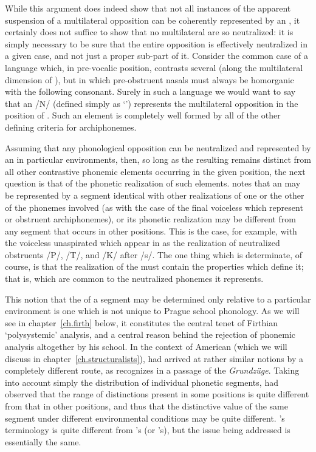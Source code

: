 While this argument does indeed show that not all instances of the
apparent suspension of a multilateral opposition can be coherently
represented by an , it certainly does not suffice to show
that no multilateral  are so neutralized: it is simply
necessary to be sure that the entire opposition is effectively
neutralized in a given case, and not just a proper sub-part of
it. Consider the common case of a language which, in pre-vocalic
position, contrasts several  (along the multilateral
dimension of ), but in which pre-obstruent nasals
must always be homorganic with the following consonant. Surely in such
a language we would want to say that an  /N/ (defined
simply as `') represents the multilateral opposition in
the position of . Such an element is completely well
formed by all of the other defining criteria for archiphonemes.

Assuming that any phonological opposition can be neutralized and
repre\-sented by an  in particular environments, then, so
long as the resulting  remains distinct from all other
contrastive phonemic elements occurring in the given position, the
next question is that of the phonetic realization of such
elements. {\Trubetzkoy} notes that an  may be represented by
a segment identical with other realizations of one or the other of the
phonemes involved (as with the case of the final voiceless  which
represent  or  obstruent archiphonemes), or its phonetic
realization may be different from any segment that occurs in other
positions. This is the case, for example, with the voiceless
unaspirated  which appear in  as the realization of
neutralized obstruents /P/, /T/, and /K/ after /s/. The one thing
which is determinate, of course, is that the realization of the
 must contain the properties which define it; that is,
which are common to the neutralized phonemes it represents.

This notion that the  of a segment may be
determined only relative to a particular environment is one which is
not unique to Prague school phonology. As we will see in
chapter~\ref{ch.firth} below, it constitutes the central tenet of
Firthian `polysystemic' analysis, and a central reason behind the
rejection of phonemic analysis altogether by his school. In the
context of American  (which we will discuss in
chapter~\ref{ch.structuralists}), \citet{twaddell35:on.defining} had
arrived at rather similar notions by a completely different route, as
{\Trubetzkoy} recognizes in a passage of the \emph{Grundzüge}. Taking
into account simply the distribution of individual phonetic segments,
{\Twaddell} had observed that the range of distinctions present in some
positions is quite different from that in other positions, and thus
that the distinctive value of the same segment under different
environmental conditions may be quite different. {\Twaddell}'s
terminology is quite different from {\Trubetzkoy}'s (or {\Firth}'s), but the
issue being addressed is essentially the same.

